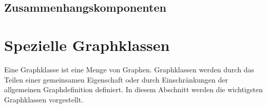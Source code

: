 \subsection{Zusammenhangskomponenten}

\newpage
\section{Spezielle Graphklassen}
Eine Graphklasse ist eine Menge von Graphen. Graphklassen werden durch das Teilen einer gemeinsamen Eigenschaft oder durch Einschränkungen der allgemeinen Graphdefinition definiert. In diesem Abschnitt werden die wichtigsten Graphklassen vorgestellt.

